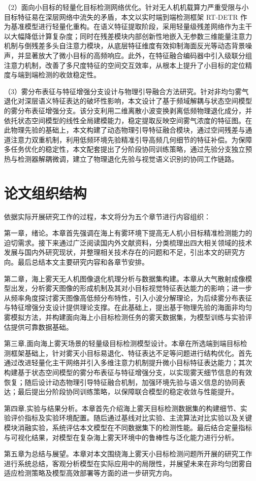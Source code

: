 {（2）面向小目标的轻量化目标检测网络优化}。针对无人机机载算力严重受限与小目标特征易在深层网络中流失的矛盾，本文以实时端到端检测框架 RT-DETR 作为基准模型进行轻量化重构。在语义特征提取阶段，采用轻量级残差网络作为主干以大幅降低计算复杂度；同时在残差模块内部创新性地嵌入无参数三维能量注意力机制与倒残差多头自注意力模块，从底层特征维度有效抑制海面反光等动态背景噪声，并显著放大了微小目标的高频响应。此外，在特征融合编码器中引入级联分组注意力机制，改善了多尺度特征的空间交互效率，从根本上提升了小目标的定位精度与端到端检测的收敛稳定性。

{（3）雾分布表征与特征增强分支设计与物理引导融合方法研究}。针对非均匀雾气退化对深层语义特征表达的破坏性影响，本文设计了基于频域解耦与状态空间模型的雾分布表征增强分支。该分支利用二维离散小波变换剥离低频物理退化成分，并依托状态空间模型的线性全局建模能力，稳定提取反映空间雾气浓度的特征图。在此物理先验的基础上，本文构建了动态物理引导特征融合模块，通过空间残差与通道注意力双重机制，利用低频环境先验精准引导高频几何细节的特征补偿。为保障多任务优化的稳定性，本文配套提出了分阶段协同训练策略，通过先验分支独立预热与检测器解耦微调，建立了物理退化先验与视觉语义识别的协同工作链路。

\section{论文组织结构}
依据实际开展研究工作的过程，本文将分为五个章节进行内容组织：

第一章，绪论。本章首先强调在海上有雾环境下提高无人机小目标精准检测能力的迫切需求。接下来通过广泛阅读国内外文献资料，分类梳理出四大相关领域的技术发展与国内外研究现状，并整理相关技术存在的问题和不足，引出本文的研究方向。最后总结本文主要研究内容和各章节安排。 

第二章，海上雾天无人机图像退化机理分析与数据集构建。本章从大气散射成像模型出发，分析雾天图像的形成机制及其对小目标视觉特征表达能力的影响；进一步从频率角度探讨雾天图像高低频分布特性，引入小波分解理论，为后续雾分布表征与特征增强分支设计提供理论支撑。在此基础上，提出基于物理先验的海面非均匀雾模拟方法，并构建面向海上小目标检测任务的雾天数据集，为模型训练与实验评估提供可靠数据基础。

第三章,面向海上雾天场景的轻量级目标检测模型设计。本章在所选端到端目标检测框架基础上，针对雾天小目标易退化、特征表达不足等问题进行结构优化。首先通过改进轻量化主干网络并引入多维注意力机制提升微小目标特征表达能力；其次构建基于状态空间模型的雾分布表征与特征增强分支，以实现雾天细节信息的有效恢复；随后设计动态物理引导特征融合机制，加强环境先验与语义信息的协同表达；最后提出分阶段协同训练策略，以保障联合模型的稳定收敛与性能提升。

第四章,实验与结果分析。本章首先介绍海上雾天目标检测数据集的构建细节、实验评价指标及实验环境配置。随后通过基线对比实验、主流算法对比实验以及关键模块消融实验，系统评估本文模型在不同数据集下的检测性能。最后结合定量指标与可视化结果，对模型在复杂海上雾天环境中的鲁棒性与泛化能力进行分析。

第五章为总结与展望。本章对本文围绕海上雾天小目标检测问题所开展的研究工作进行系统总结，客观分析模型在实际应用中的局限性，并展望未来在非均匀团雾自适应检测策略及模型高效部署等方面的进一步研究方向。









